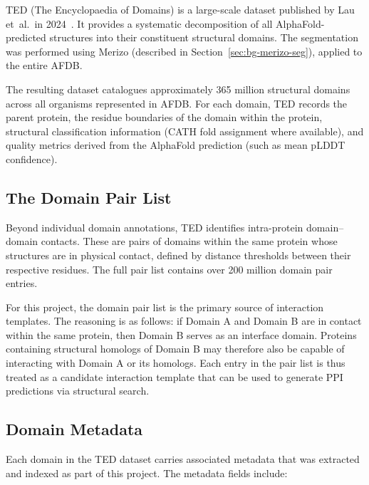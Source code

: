 TED (The Encyclopaedia of Domains) is a large-scale dataset published by Lau et~al.\ in 2024~\cite{ted_dataset}.
It provides a systematic decomposition of all AlphaFold-predicted structures into their constituent structural domains.
The segmentation was performed using Merizo (described in Section~\ref{sec:bg-merizo-seg}), applied to the entire AFDB.

The resulting dataset catalogues approximately 365 million structural domains across all organisms represented in AFDB.
For each domain, TED records the parent protein, the residue boundaries of the domain within the protein, structural classification information (CATH fold assignment where available), and quality metrics derived from the AlphaFold prediction (such as mean pLDDT confidence).

\subsection{The Domain Pair List}

Beyond individual domain annotations, TED identifies intra-protein domain--domain contacts.
These are pairs of domains within the same protein whose structures are in physical contact, defined by distance thresholds between their respective residues.
The full pair list contains over 200 million domain pair entries.

For this project, the domain pair list is the primary source of interaction templates.
The reasoning is as follows: if Domain A and Domain B are in contact within the same protein, then Domain B serves as an interface domain.
Proteins containing structural homologs of Domain B may therefore also be capable of interacting with Domain A or its homologs.
Each entry in the pair list is thus treated as a candidate interaction template that can be used to generate PPI predictions via structural search.

\subsection{Domain Metadata}

Each domain in the TED dataset carries associated metadata that was extracted and indexed as part of this project.
The metadata fields include:

